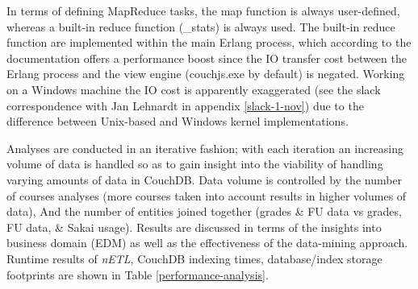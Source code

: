 In terms of defining MapReduce tasks, the map function is always user-defined, whereas a built-in reduce function (\_stats) is always used. The built-in reduce function are implemented within the main Erlang process, which according to the documentation offers a performance boost since the IO transfer cost between the Erlang process and the view engine (couchjs.exe by default) is negated. Working on a Windows machine the IO cost is apparently exaggerated (see the slack correspondence with Jan Lehnardt in appendix \ref{slack-1-nov}) due to the difference between Unix-based and Windows kernel implementations.

Analyses are conducted in an iterative fashion; with each iteration an increasing volume of data is handled so as to gain insight into the viability of handling varying amounts of data in CouchDB. Data volume is controlled by the number of courses analyses (more courses taken into account results in higher volumes of data), And the number of entities joined together (grades \& FU data vs grades, FU data, \& Sakai usage). Results are discussed in terms of the insights into business domain (EDM) as well as the effectiveness of the data-mining approach. Runtime results of \textit{nETL}, CouchDB indexing times, database/index storage footprints are shown in Table \ref{performance-analysis}.

